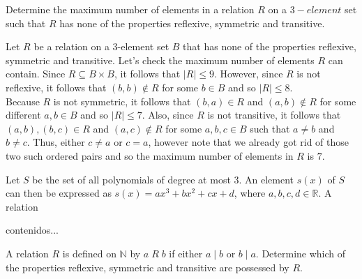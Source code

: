 \documentclass[12pt]{article}
\newcommand{\N}{\mathbb{N}}
\newcommand{\R}{\mathbb{R}}
\newenvironment{problem}[2][Problem]{\begin{trivlist}
		\item[\hskip \labelsep {\bfseries #1}\hskip \labelsep {\bfseries #2.}]}{\end{trivlist}}
\newenvironment{solution}[2][Solution]{\begin{trivlist}
		\item[\hskip \labelsep {\bfseries #1}\hskip \labelsep {\bfseries #2.}]}{\end{trivlist}}
\begin{document}
 	\begin{problem}{20}
 		Determine the maximum number of elements in a relation $R$ on a $3-element$ set such that $R$ has none of the properties reflexive, symmetric and transitive.
 		\begin{solution}{20}
 			Let $R$ be a relation on a 3-element set $B$ that has none of the properties reflexive, symmetric and transitive. Let's check the maximum number of elements $R$ can contain. Since $R\subseteq B\times B$, it follows that $|R|\leq 9$. However, since $R$ is not reflexive, it follows that $(b,b)\not\in R$ for some $b\in B$ and so $|R|\leq 8$. \\
 			 
 			Because $R$ is not symmetric, it follows that $(b,a)\in R$ and $(a,b)\not\in R$ for some different $a,b\in B$ and so $|R|\leq 7$. Also, since $R$ is not transitive, it follows that $(a,b),(b,c)\in R$ and $(a,c)\not\in R$ for some $a,b,c\in B$ such that $a\neq b$ and $b\neq c$. Thus, either $c\neq a$ or $c=a$, however note that we already got rid of those two such ordered pairs and so the maximum number of elements in $R$ is $7$.
 		\end{solution}
 	\end{problem}
 
 	\begin{problem}{21}
 		Let $S$ be the set of all polynomials of degree at most 3. An element $s(x)$ of $S$ can then be expressed as $s(x) = ax^{3} + bx^{2} +cx +d$, where $a,b,c,d\in \R$. A relation
 		\begin{solution}{21}
 			contenidos...
 		\end{solution}
 	\end{problem}
 
 	\begin{problem}{22}
 		A relation $R$ is defined on $\N$ by $a\; R \; b$ if either $a\mid b$ or $b\mid a$. Determine which of the properties reflexive, symmetric and transitive are possessed by $R$.
 	\end{problem}
\end{document}
